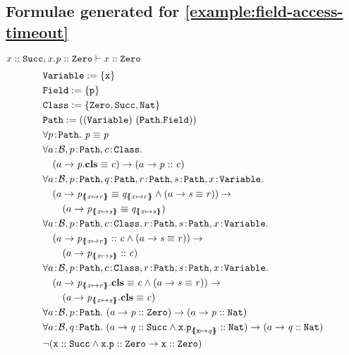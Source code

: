\documentclass[a4paper]{article}
\begin{document}
\subsection{Formulae generated for \ref{example:field-access-timeout}}
$\mathit{x} :: \mathit{\mathtt{Succ}}, \mathit{x.p} :: \mathit{\mathtt{Zero}} \vdash \mathit{x} :: \mathit{\mathtt{Zero}}$
\begin{align}
  &\texttt{\Variable} := \{\mathtt{x}\}\\
  &\texttt{\Field} := \{\mathtt{p}\}\\
  &\texttt{\Class} := \{\Zero,\Succ,\Nat\}\\
  &\Path := ((\Variable)~(\Path.\Field))\\
  &\forall \sortedVar{p}{\Path}.~\pathEq{p}{p}\\
  &\forall \sortedVar{a}{\TBool}, \sortedVar{p}{\Path}, \sortedVar{c}{\Class}.\\
  &\quad(a \rightarrow \instBy{p}{c}) \rightarrow (a \rightarrow \instOf{p}{c})\\
  &\forall \sortedVar{a}{\TBool}, \sortedVar{p}{\Path}, \sortedVar{q}{\Path}, \sortedVar{r}{\Path}, \sortedVar{s}{\Path}, \sortedVar{x}{\Variable}.\\
  &\quad (a \rightarrow \pathEq{p_{\sub{x}{r}}}{q_{\sub{x}{r}}} \land (a \rightarrow \pathEq{s}{r})) \rightarrow\\
  &\qquad (a \rightarrow \pathEq{p_{\sub{x}{s}}}{q_{\sub{x}{s}}})\\
  &\forall \sortedVar{a}{\TBool}, \sortedVar{p}{\Path}, \sortedVar{c}{\Class}, \sortedVar{r}{\Path}, \sortedVar{s}{\Path}, \sortedVar{x}{\Variable}.\\
  &\quad (a \rightarrow \instOf{p_{\sub{x}{r}}}{c} \land (a \rightarrow \pathEq{s}{r})) \rightarrow\\
  &\qquad (a \rightarrow \instOf{p_{\sub{x}{s}}}{c})\\
  &\forall \sortedVar{a}{\TBool}, \sortedVar{p}{\Path}, \sortedVar{c}{\Class}, \sortedVar{r}{\Path}, \sortedVar{s}{\Path}, \sortedVar{x}{\Variable}.\\
  &\quad (a \rightarrow \instBy{p_{\sub{x}{r}}}{c} \land (a \rightarrow \pathEq{s}{r})) \rightarrow\\
  &\qquad (a \rightarrow \instBy{p_{\sub{x}{s}}}{c})\\
  &\forall \sortedVar{a}{\TBool}, \sortedVar{p}{\Path}.~(a \rightarrow \instOf{p}{\Zero}) \rightarrow (a \rightarrow \instOf{p}{\Nat})\\
  &\forall \sortedVar{a}{\TBool}, \sortedVar{q}{\Path}.~(a \rightarrow \instOf{q}{\Succ} \land \instOf{\mathtt{x.p}_{\sub{\mathtt{x}}{q}}}{\Nat}) \rightarrow (a \rightarrow \instOf{q}{\Nat})\\
  & \neg (\instOf{\mathtt{x}}{\Succ} \land \instOf{\mathtt{x.p}}{\Zero} \rightarrow \instOf{\mathtt{x}}{\Zero})
\end{align}
\end{document}
